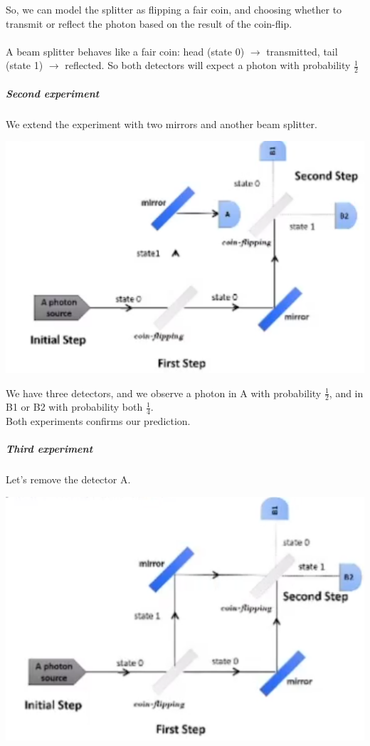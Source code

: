\documentclass[10pt]{report}
\begin{document}
So, we can model the splitter as flipping a fair coin, and choosing whether to transmit or reflect the photon based on the result of the coin-flip.\\\\
A beam splitter behaves like a fair coin: head (state 0) $\rightarrow$ transmitted, tail (state 1) $\rightarrow$ reflected. So both detectors will expect a photon with probability $\frac{1}{2}$
\subparagraph{Second experiment} We extend the experiment with two mirrors and another beam splitter.
\begin{center}
	\includegraphics[scale=0.5]{2.png}
\end{center}
We have three detectors, and we observe a photon in A with probability $\frac{1}{2}$, and in B1 or B2 with probability both $\frac{1}{4}$.\\
Both experiments confirms our prediction.
\subparagraph{Third experiment} Let's remove the detector A.\begin{center}
	\includegraphics[scale=0.5]{3.png}
\end{center}
\end{document}
